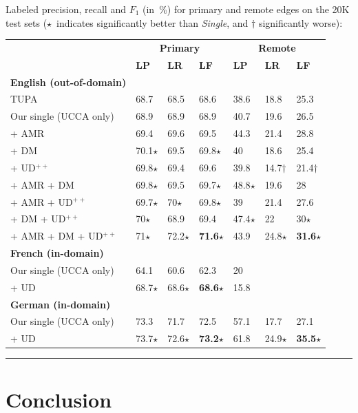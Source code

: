 \documentclass[a0,portrait]{a0poster}
\begin{document}
\begin{multicols}{2}
Labeled precision, recall and $F_1$ (in~\%) for primary and remote edges
on the 20K test sets
($\star$~indicates significantly better than \textit{Single},
and $\dagger$ significantly worse):
\begin{center}
\setlength\tabcolsep{1cm}
\begin{tabular}{l|lll|lll}
& \multicolumn{3}{c|}{\bf Primary} & \multicolumn{3}{c}{\bf Remote} \\
& \textbf{LP} & \textbf{LR} & \textbf{LF}
& \textbf{LP} & \textbf{LR} & \textbf{LF} \\
\hline
\bf English (out-of-domain) & \\
TUPA \cite{hershcovich2017a}
& 68.7 & 68.5 & 68.6 & 38.6 & 18.8 & 25.3 \\
Our single (UCCA only)
& 68.9 & 68.9 & 68.9 & 40.7 & 19.6 & 26.5 \\
\cline{1-1}
+ AMR
& 69.4 & 69.6 & 69.5 & 44.3 & 21.4 & 28.8 \\
+ DM
& 70.1$\star$ & 69.5 & 69.8$\star$ & 40 & 18.6 & 25.4 \\
+ UD$^{++}$
& 69.8$\star$ & 69.4 & 69.6 & 39.8 & 14.7$\dagger$ & 21.4$\dagger$ \\
+ AMR + DM
& 69.8$\star$ & 69.5 & 69.7$\star$ & 48.8$\star$ & 19.6 & 28 \\
+ AMR + UD$^{++}$
& 69.7$\star$ & 70$\star$ & 69.8$\star$ & 39 & 21.4 & 27.6 \\
+ DM + UD$^{++}$
& 70$\star$ & 68.9 & 69.4 & 47.4$\star$ & 22 & 30$\star$ \\
+ AMR + DM + UD$^{++}$
& 71$\star$ & 72.2$\star$ & \textbf{71.6}$\star$ & 43.9 & 24.8$\star$ & \textbf{31.6}$\star$ \\
\hline
\bf French (in-domain) & \\
Our single (UCCA only) & 64.1 & 60.6 & 62.3 & 20 & \enskip 5.7 & \enskip 8.8 \\
+ UD & 68.7$\star$ & 68.6$\star$ & \textbf{68.6}$\star$ & 15.8 & \enskip 5.7 & \enskip 8.3 \\
\hline
\bf German (in-domain) & \\
Our single (UCCA only) & 73.3 & 71.7 & 72.5 & 57.1 & 17.7 & 27.1 \\
+ UD & 73.7$\star$ & 72.6$\star$ & \textbf{73.2}$\star$ & 61.8 & 24.9$\star$ & \textbf{35.5}$\star$
\end{tabular}
\end{center}

\hrule


\section*{Conclusion}


\end{multicols}
\end{document}
